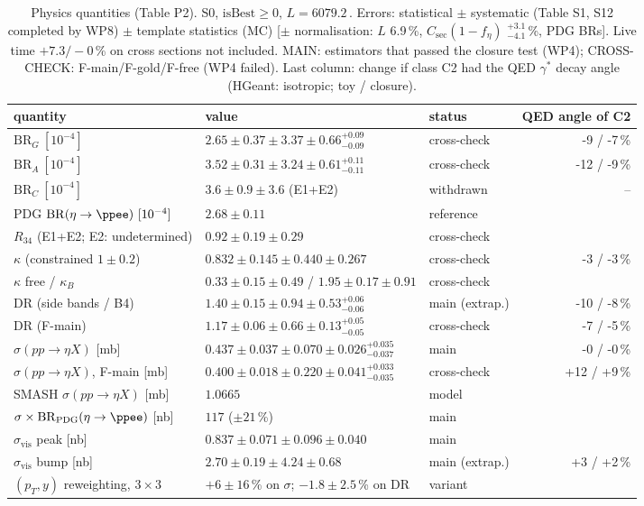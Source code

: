 \begin{table}[H]
\centering
\caption{Physics quantities (Table P2). S0, $\mathrm{isBest}\geq0$, $L=6079.2$\,\nbinv. Errors: statistical $\pm$ systematic (Table S1, S12 completed by WP8) $\pm$ template statistics (MC) [$\pm$ normalisation: $L$ 6.9\,\%, $C_{\mathrm{sec}}(1-f_\eta)$ $^{+3.1}_{-4.1}$\,\%, PDG BRs]. Live time $+7.3/-0$\,\% on cross sections not included. MAIN: estimators that passed the closure test (WP4); CROSS-CHECK: F-main/F-gold/F-free (WP4 failed). Last column: change if class C2 had the QED $\gamma^*$ decay angle (HGeant: isotropic; toy / closure).}
\label{tab:P2}
\scriptsize
\setlength{\tabcolsep}{2.5pt}
\begin{tabular}{@{}l l l r@{}}
\toprule
quantity & value & status & QED angle of C2 \\
\midrule
$\mathrm{BR}_G\ [10^{-4}]$ & $2.65 \pm 0.37 \pm 3.37 \pm 0.66 ^{+0.09}_{-0.09}$ & cross-check & -9 / -7\,\% \\
$\mathrm{BR}_A\ [10^{-4}]$ & $3.52 \pm 0.31 \pm 3.24 \pm 0.61 ^{+0.11}_{-0.11}$ & cross-check & -12 / -9\,\% \\
$\mathrm{BR}_C\ [10^{-4}]$ & $3.6 \pm 0.9 \pm 3.6$ (E1+E2) & withdrawn & -- \\
PDG $\mathrm{BR}(\eta\to\ppee)\ [10^{-4}]$ & $2.68\pm0.11$ & reference & \\
$R_{34}$ (E1+E2; E2: undetermined) & $0.92\pm0.19\pm0.29$ & cross-check & \\
$\kappa$ (constrained $1\pm0.2$) & $0.832 \pm 0.145 \pm 0.440 \pm 0.267$ & cross-check & -3 / -3\,\% \\
$\kappa$ free / $\kappa_B$ & $0.33\pm0.15\pm0.49$ / $1.95\pm0.17\pm0.91$ & cross-check & \\
DR (side bands / B4) & $1.40 \pm 0.15 \pm 0.94 \pm 0.53 ^{+0.06}_{-0.06}$ & main (extrap.) & -10 / -8\,\% \\
DR (F-main) & $1.17 \pm 0.06 \pm 0.66 \pm 0.13 ^{+0.05}_{-0.05}$ & cross-check & -7 / -5\,\% \\
$\sigma(pp\to\eta X)$ [mb] & $0.437 \pm 0.037 \pm 0.070 \pm 0.026 ^{+0.035}_{-0.037}$ & main & -0 / -0\,\% \\
$\sigma(pp\to\eta X)$, F-main [mb] & $0.400 \pm 0.018 \pm 0.220 \pm 0.041 ^{+0.033}_{-0.035}$ & cross-check & +12 / +9\,\% \\
SMASH $\sigma(pp\to\eta X)$ [mb] & $1.0665$ & model & \\
$\sigma\times\mathrm{BR}_{\mathrm{PDG}}(\eta\to\ppee)$ [nb] & $117$ ($\pm21$\,\%) & main & \\
$\sigma_{\mathrm{vis}}$ peak [nb] & $0.837 \pm 0.071 \pm 0.096 \pm 0.040$ & main & \\
$\sigma_{\mathrm{vis}}$ bump [nb] & $2.70 \pm 0.19 \pm 4.24 \pm 0.68$ & main (extrap.) & +3 / +2\,\% \\
$(p_T,y)$ reweighting, $3\times3$ & $+6\pm16$\,\% on $\sigma$; $-1.8\pm2.5$\,\% on DR & variant & \\
\bottomrule
\end{tabular}
\end{table}
